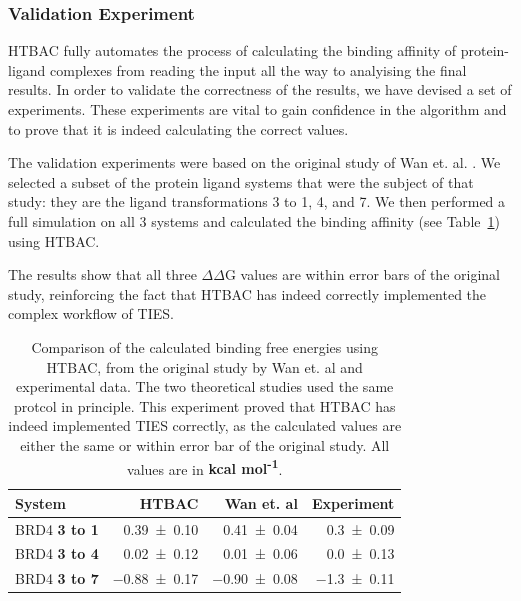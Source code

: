 \subsubsection{Validation Experiment}

HTBAC fully automates the process of calculating the binding affinity of
protein-ligand complexes from reading the input all the way to analyising the
final results. In order to validate the correctness of the results, we have
devised a set of experiments. These experiments are vital to gain confidence
in the algorithm and to prove that it is indeed calculating the correct values.

The validation experiments were based on the original study of Wan et. al.
\cite{Wan2017brd4}. We selected a subset of the protein ligand systems that
were the subject of that study: they are the ligand transformations 3 to 1, 4,
and 7. We then performed a full simulation on all 3 systems and calculated the
binding affinity (see Table~\ref{tab:exp2}) using HTBAC.

The results show that all three $\Delta \Delta$G values are within error bars
of the original study, reinforcing the fact that HTBAC has indeed correctly
implemented the complex workflow of TIES.

\begin{table}
  \centering
  \begin{tabular}{l@{\hskip 1in}r@{\hskip 0.2in}r@{\hskip 0.2in}r}
    \toprule
    System & HTBAC & Wan et. al & Experiment \\
    \midrule
    BRD4 \textbf{3 to 1} & \num{0.39 +- 0.10} &   \num{0.41 +- 0.04} &  \num{0.3 +- 0.09} \\
    BRD4 \textbf{3 to 4} & \num{0.02 +- 0.12} &   \num{0.01 +- 0.06} &  \num{0.0 +- 0.13} \\
    BRD4 \textbf{3 to 7} & \num{-0.88 +- 0.17} &  \num{-0.90 +- 0.08} & \num{-1.3 +- 0.11} \\
    \bottomrule
  \end{tabular}

  \caption{Comparison of the calculated binding free energies using HTBAC, from
  the original study by Wan et. al and experimental data. The two theoretical
  studies used the same protcol in principle. This experiment proved that HTBAC
  has indeed implemented TIES correctly, as the calculated values are either
  the same or within error bar of the original study. All values are in
  \textbf{kcal mol\textsuperscript{-1}}.}
  \label{tab:exp2}


\end{table}

